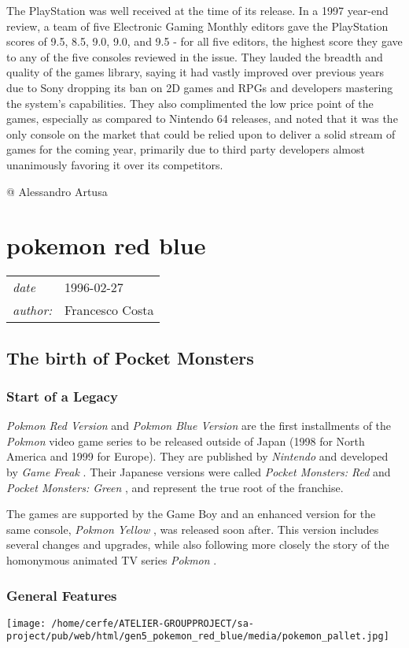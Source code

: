 \documentclass[a4paper,10pt]{book}
\newcommand{\pageHeader}[4]{
    \section{#1}
    \vspace{-0.3cm}
    \begin{table}[h!]
     \begin{tabular}{ll}
        \hline
        \textit{date} & #2 \\
        \textit{author: } & #3\\
        \hline
     \end{tabular}
    \end{table}
    \vspace{-0.3cm}
}
\begin{document}
          The PlayStation was well received at the time of its release. In a 1997 year-end review, a team of five Electronic Gaming Monthly editors gave the PlayStation scores of 9.5, 8.5, 9.0, 9.0, and 9.5 - for all five editors, the highest score they gave to any of the five consoles reviewed in the issue. They lauded the breadth and quality of the games library, saying it had vastly improved over previous years due to Sony dropping its ban on 2D games and RPGs and developers mastering the system's capabilities. They also complimented the low price point of the games, especially as compared to Nintendo 64 releases, and noted that it was the only console on the market that could be relied upon to deliver a solid stream of games for the coming year, primarily due to third party developers almost unanimously favoring it over its competitors.
         
 
 @ Alessandro Artusa 
 
 \newpage\pageHeader{pokemon red blue}{1996-02-27}{Francesco Costa}{The first installments of the world famous series of video games: Pokmon}
 \subsection{The birth of Pocket Monsters }
 
 \subsubsection{Start of a Legacy }
 
 \textit{Pokmon Red Version } and  \textit{Pokmon Blue Version } are the first installments
          of the  \textit{Pokmon } video game series to be released outside of Japan (1998 for
          North America and 1999 for Europe). They are published by  \textit{Nintendo } and developed by  \textit{Game Freak }.
          Their Japanese versions were called  \textit{Pocket Monsters: Red } and  \textit{Pocket Monsters: Green },
          and represent the true root of the franchise.
           
          The games are supported by the Game Boy and an enhanced version for the same console,
           \textit{Pokmon Yellow }, was released soon after. This version includes several changes and
          upgrades, while also following more closely the story of the homonymous
          animated TV series  \textit{Pokmon }.
         
 
 \subsubsection{General Features }
 \texttt{[image: /home/cerfe/ATELIER-GROUPPROJECT/sa-project/pub/web/html/gen5\_pokemon\_red\_blue/media/pokemon\_pallet.jpg]}
 
\end{document}
